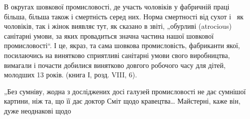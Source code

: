 \noindent{}В округах шовкової промисловості, де участь чоловіків
у фабричній праці більша, більша також і смертність серед них.
Норма смертності від сухот і~ як чоловіків, так і жінок
виявляє тут, як сказано в звіті, „обурливі (atrocious) санітарні
умови, за яких провадиться значна частина нашої шовкової
промисловості“. І це, якраз, та сама шовкова промисловість,
фабриканти якої, посилаючись на винятково сприятливі санітарні умови свого виробництва, вимагали і
почасти добилися
винятково довгого робочого часу для дітей, молодших 13 років.
(книга І, розд. VIII, 6).

„Без сумніву, жодна з досліджених досі галузей промисловості
не дає сумнішої картини, ніж та, що її дає доктор Сміт
щодо кравецтва\dots{} Майстерні, каже він, дуже неоднакові щодо

\parbreak{}  %
